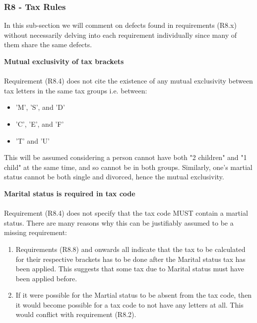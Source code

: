 \subsubsection{R8 - Tax Rules}

In this sub-section we will comment on defects found in requirements (R8.x) without necessarily delving into each requirement individually since many of them share the same defects. 
\par
\textbf{Mutual exclusivity of tax brackets \\}
\\
Requirement (R8.4) does not cite the existence of any mutual exclusivity between tax letters in the same tax groups i.e. between: 
\begin{itemize}[noitemsep]
	\item 'M', 'S', and 'D' 
	\item 'C', 'E', and 'F'
	\item 'T' and 'U'
\end{itemize}
This will be assumed considering a person cannot have both "2 children" and "1 child" at the same time, and so cannot be in both groups. Similarly, one's martial status cannot be both single and divorced, hence the mutual exclusivity.  

\textbf{Marital status is required in tax code \\}
\\
Requirement (R8.4) does not specify that the tax code MUST contain a martial status. There are many reasons why this can be justifiably assumed to be a missing requirement: 
\begin{enumerate}
	\item Requirements (R8.8) and onwards all indicate that the tax to be calculated for their respective brackets has to be done after the Marital status tax has been applied. This suggests that some tax due to Marital status must have been applied before. 
	\item If it were possible for the Martial status to be absent from the tax code, then it would become possible for a tax code to not have any letters at all. This would conflict with requirement (R8.2). %
\end{enumerate}


